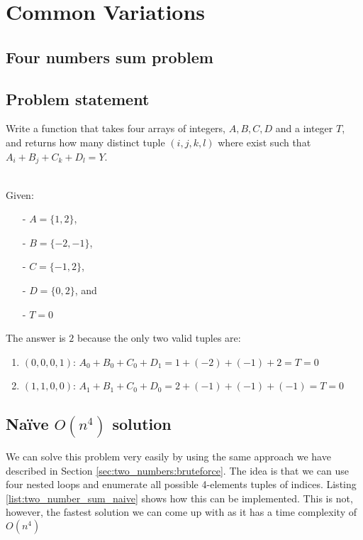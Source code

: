\section{Common Variations}
\subsection{Four numbers sum problem}
\label{sec:four_number}

\subsection{Problem statement}

\begin{exercise}
Write a function that takes four arrays of integers, $A,B,C,D$ and a integer $T$,
and returns how many distinct tuple $(i,j,k,l)$ where exist such that $A_i+B_j+C_k+D_l = Y$.

\begin{example}
\hfill \\
Given:
	\begin{itemize}
		\item[-] 	$A=\{1,2\}$,
		\item[-] 	$B=\{-2,-1\}$,
		\item[-] 	$C=\{-1,2\}$,
		\item[-]	$D=\{0,2\}$, and 
		\item[-] 	$T = 0$
	\end{itemize}
The answer is $2$ because the only two valid tuples are:
\begin{enumerate}
	\item $(0,0,0,1)$: $A_0 + B_0 + C_0 + D_1 = 1 + (-2) + (-1) + 2 = T = 0$
	\item $(1,1,0,0)$: $A_1 + B_1 + C_0 + D_0 = 2 + (-1) + (-1) + (-1) = T = 0$
\end{enumerate}
\end{example}
\end{exercise}

\subsection{Na\"ive $O(n^4)$ solution}
We can solve this problem very easily by using the same approach we have described in Section \ref{sec:two_numbers:bruteforce}.
The idea is that we can use four nested loops and enumerate all possible 4-elements tuples of indices. Listing \ref{list:two_number_sum_naive} shows how this can be implemented.
This is not, however,  the fastest solution we can come up with as it has a time complexity of $O(n^4)$

